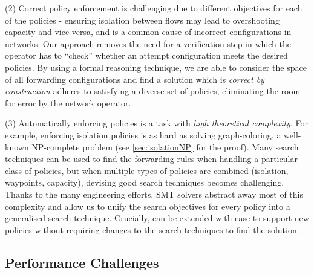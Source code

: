(2) Correct policy enforcement is challenging due to different
objectives for each of the policies - ensuring isolation between flows
may lead to overshooting capacity and vice-versa, and is a common
cause of incorrect configurations in networks. 
Our approach removes the need for a verification step in which the operator
has to ``check'' whether an attempt configuration meets the desired policies.
By using a formal
reasoning technique, we are able to consider the space of all
forwarding configurations and find a solution which 
is \emph{correct by construction}
adheres to
satisfying a diverse set of policies, eliminating the room for error
by the network operator. 

(3) Automatically enforcing policies is a task with
\emph{high theoretical complexity}. 
For example, enforcing isolation policies
is as hard as solving
graph-coloring, a well-known
NP-complete problem (see \cref{sec:isolationNP} for the proof).
Many  search
techniques can be used to find the forwarding rules when handling
a particular class of policies, 
but when multiple types of policies are combined (isolation, waypoints, capacity),
devising good search techniques becomes challenging. 
Thanks to the many engineering efforts, SMT solvers abstract away
most of this complexity and allow us
 to unify the search objectives for every policy into a generalised
search technique. 
Crucially, \Name can be extended with ease to
support new policies without requiring changes to the search
techniques to find the solution.
\subsection{Performance Challenges} \label{sec:performance}

